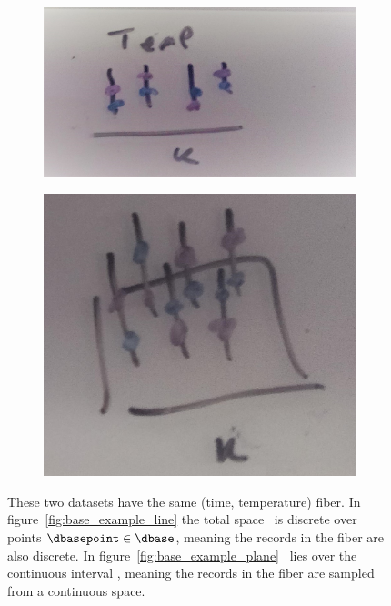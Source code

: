 \documentclass[../main.tex]{subfiles}
\begin{document}
\begin{figure}[ht!]
    \begin{subfigure}{.5\textwidth}
        \includegraphics[width=\textwidth]{figures/math/temp_1k.png}
        \caption{}
        \label{fig:base_example_discrete}
    \end{subfigure}
    \begin{subfigure}{.5\textwidth}
        \includegraphics[width=\textwidth]{figures/math/temp_2k.png}
        \caption{}
        \label{fig:base_example_continuous}
    \end{subfigure}
    \caption{These two datasets have the same (time, temperature) fiber. In figure~\ref{fig:base_example_line} the total space \dtotal\ is discrete over points $\dbasepoint \in \dbase$, meaning the records in the fiber are also discrete. In figure~\ref{fig:base_example_plane} \dtotal\ lies over the continuous interval \dbase, meaning the records in the fiber are sampled from a continuous space. 
    }
    \label{fig:base_example}
\end{figure}
\end{document}
